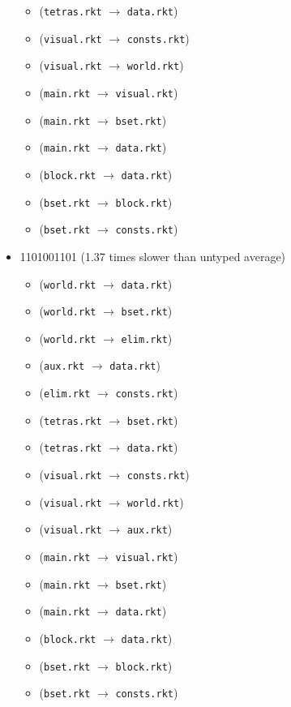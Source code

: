 \documentclass{article}
\newcommand{\mono}[1]{\texttt{#1}}
\begin{document}
\begin{itemize}
\begin{itemize}
  \item (\mono{tetras.rkt} $\rightarrow$ \mono{data.rkt})
  \item (\mono{visual.rkt} $\rightarrow$ \mono{consts.rkt})
  \item (\mono{visual.rkt} $\rightarrow$ \mono{world.rkt})
  \item (\mono{main.rkt} $\rightarrow$ \mono{visual.rkt})
  \item (\mono{main.rkt} $\rightarrow$ \mono{bset.rkt})
  \item (\mono{main.rkt} $\rightarrow$ \mono{data.rkt})
  \item (\mono{block.rkt} $\rightarrow$ \mono{data.rkt})
  \item (\mono{bset.rkt} $\rightarrow$ \mono{block.rkt})
  \item (\mono{bset.rkt} $\rightarrow$ \mono{consts.rkt})
  \end{itemize}
\item 1101001101 (1.37 times slower than untyped average)
  \begin{itemize}
  \item (\mono{world.rkt} $\rightarrow$ \mono{data.rkt})
  \item (\mono{world.rkt} $\rightarrow$ \mono{bset.rkt})
  \item (\mono{world.rkt} $\rightarrow$ \mono{elim.rkt})
  \item (\mono{aux.rkt} $\rightarrow$ \mono{data.rkt})
  \item (\mono{elim.rkt} $\rightarrow$ \mono{consts.rkt})
  \item (\mono{tetras.rkt} $\rightarrow$ \mono{bset.rkt})
  \item (\mono{tetras.rkt} $\rightarrow$ \mono{data.rkt})
  \item (\mono{visual.rkt} $\rightarrow$ \mono{consts.rkt})
  \item (\mono{visual.rkt} $\rightarrow$ \mono{world.rkt})
  \item (\mono{visual.rkt} $\rightarrow$ \mono{aux.rkt})
  \item (\mono{main.rkt} $\rightarrow$ \mono{visual.rkt})
  \item (\mono{main.rkt} $\rightarrow$ \mono{bset.rkt})
  \item (\mono{main.rkt} $\rightarrow$ \mono{data.rkt})
  \item (\mono{block.rkt} $\rightarrow$ \mono{data.rkt})
  \item (\mono{bset.rkt} $\rightarrow$ \mono{block.rkt})
  \item (\mono{bset.rkt} $\rightarrow$ \mono{consts.rkt})

\end{itemize}
\end{itemize}
\end{document}
